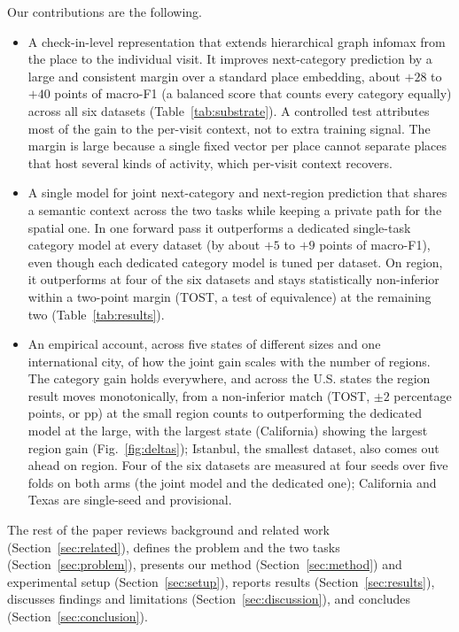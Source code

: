 Our contributions are the following.
\begin{itemize}
  \item A check-in-level representation that extends hierarchical graph infomax
    from the place to the individual visit. It improves next-category
    prediction by a large and consistent margin over a standard place embedding,
    about $+28$ to $+40$ points of macro-F1 (a balanced score that counts every
    category equally) across all six datasets (Table~\ref{tab:substrate}). A controlled test attributes most of the gain to the per-visit
    context, not to extra training signal. The margin is large because a single fixed vector
    per place cannot separate places that host several kinds of activity, which
    per-visit context recovers.
  \item A single model for joint next-category and next-region prediction that
    shares a semantic context across the two tasks while keeping a private path
    for the spatial one. In one forward pass it outperforms a dedicated
    single-task category model at every dataset (by about $+5$ to $+9$ points of
    macro-F1), even though each dedicated category model is tuned per dataset. On region,
    it outperforms at four of the six datasets and stays
    statistically non-inferior within a two-point margin (TOST, a test of
    equivalence) at the remaining two (Table~\ref{tab:results}).
  \item An empirical account, across five states of different sizes and one
    international city, of how the joint gain scales with the number of regions.
    The category gain holds everywhere, and across the U.S. states the region
    result moves monotonically, from a non-inferior match (TOST, $\pm2$
    percentage points, or pp) at the small region counts to outperforming the
    dedicated model at the large, with the largest state (California) showing
    the largest region gain (Fig.~\ref{fig:deltas}); Istanbul, the smallest
    dataset, also comes out ahead on region. Four of the six datasets are
    measured at four seeds over five folds on both arms (the joint model and
    the dedicated one); California and Texas are single-seed and provisional.
\end{itemize}

The rest of the paper reviews background and related work
(Section~\ref{sec:related}), defines the problem and the two tasks
(Section~\ref{sec:problem}), presents our method (Section~\ref{sec:method}) and
experimental setup (Section~\ref{sec:setup}), reports results
(Section~\ref{sec:results}), discusses findings and limitations
(Section~\ref{sec:discussion}), and concludes (Section~\ref{sec:conclusion}).
